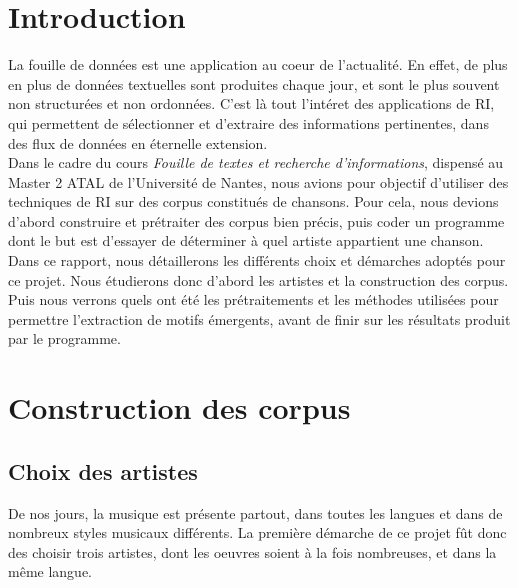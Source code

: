 \documentclass[a4paper]{article}
\begin{document}
	

	\section*{Introduction}
	
	La fouille de données est une application au coeur de l'actualité. En effet, de plus en plus de données textuelles sont produites chaque jour, et sont le plus souvent non structurées et non ordonnées. C'est là tout l'intéret des applications de RI, qui permettent de sélectionner et d'extraire des informations pertinentes, dans des flux de données en éternelle extension.\\
	
	Dans le cadre du cours \textit{Fouille de textes et recherche d’informations}, dispensé au Master 2 ATAL de l'Université de Nantes, nous avions pour objectif d'utiliser des techniques de RI sur des corpus constitués de chansons. Pour cela, nous devions d'abord construire et prétraiter des corpus bien précis, puis coder un programme dont le but est d'essayer de déterminer à quel artiste appartient une chanson.\\
	
	Dans ce rapport, nous détaillerons les différents choix et démarches adoptés pour ce projet. Nous étudierons donc d'abord les artistes et la construction des corpus. Puis nous verrons quels ont été les prétraitements et les méthodes utilisées pour permettre l'extraction de motifs émergents, avant de finir sur les résultats produit par le programme.

	\section{Construction des corpus}
	
	\subsection{Choix des artistes}
	
	De nos jours, la musique est présente partout, dans toutes les langues et dans de nombreux styles musicaux différents. La première démarche de ce projet fût donc des choisir trois artistes, dont les oeuvres soient à la fois nombreuses, et dans la même langue. \\
	
\end{document}
